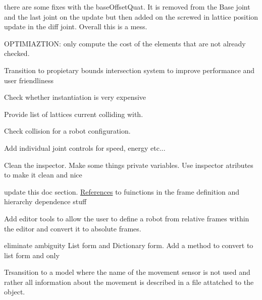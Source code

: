 \begin{DoxyRefList}
there are some fixes with the base\+Offset\+Quat. It is removed from the Base joint and the last joint on the update but then added on the screwed in lattice position update in the diff joint. Overall this is a mess. 
\item[Member \mbox{\hyperlink{class_illa_graph_node_ab5e3aa47f179ee2d8ad84620cf11db85}{Illa\+Graph\+Node.Draw\+Outgoing\+Edges\+With\+Cost}} (\mbox{\hyperlink{class_illa_graph_node}{Illa\+Graph\+Node}} previous\+Node\+To\+Draw)]\label{todo__todo000002}%
%
OPTIMIAZTION\+: only compute the cost of the elements that are not already checked.  
\item[Class \mbox{\hyperlink{class_illa_node_sensor_script}{Illa\+Node\+Sensor\+Script}} ]\label{todo__todo000003}%
%
Transition to propietary bounds intersection system to improve performance and user friendliness  
\item[Member \mbox{\hyperlink{class_inchworm_robot_controller_a434da4643498bd898d99a63678492ae4}{Inchworm\+Robot\+Controller.Is\+Pose\+Colliding}} (\mbox{\hyperlink{class_pos_j}{PosJ}} Pose\+To\+Check)]\label{todo__todo000004}%
%
Check whether instantiation is very expensive

\label{todo__todo000005}%
%
Provide list of lattices current colliding with.

\label{todo__todo000006}%
%
Check collision for a robot configuration.  
\item[Class \mbox{\hyperlink{class_joint_class}{Joint\+Class}} ]\label{todo__todo000007}%
%
Add individual joint controls for speed, energy etc... 



Clean the inspector. Make some things private variables. Use inspector atributes to make it clean and nice

\label{todo__todo000008}%
%
update this doc section. \mbox{\hyperlink{class_references}{References}} to fuinctions in the frame definition and hierarchy dependence stuff

\label{todo__todo000009}%
%
Add editor tools to allow the user to define a robot from relative frames within the editor and convert it to absolute frames. 
\item[Class \mbox{\hyperlink{class_movement}{Movement}} ]\label{todo__todo000010}%
%
eliminate ambiguity List form and Dictionary form. Add a method to convert to list form and only  
\item[Member \mbox{\hyperlink{class_robot_script_aaaacc0eacd09c68f0e399dfb780c16a3}{Robot\+Script.Get\+Possible\+Movement\+Sensors}} ()]\label{todo__todo000011}%
%
Trsansition to a model where the name of the movement sensor is not used and rather all information about the movement is described in a file attatched to the object. ~\newline
  

\end{DoxyRefList}
